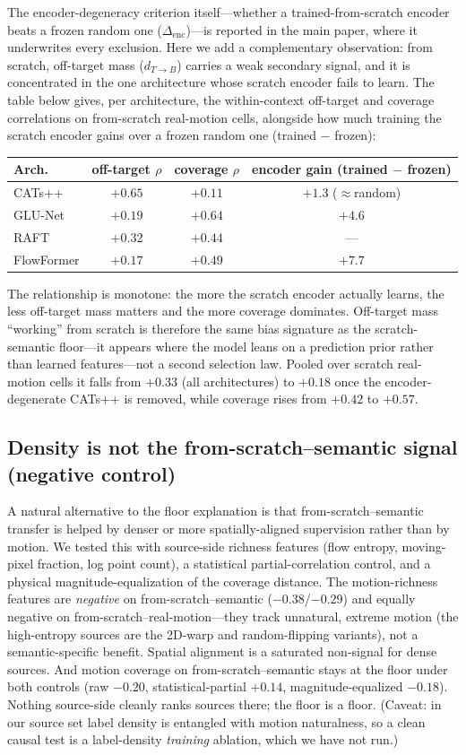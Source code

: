 \documentclass[runningheads]{llncs}
\newcommand{\dtb}{d_{T\to B}}
\begin{document}
The encoder-degeneracy criterion itself---whether a trained-from-scratch encoder
beats a frozen random one ($\Delta_{\text{enc}}$)---is reported in the main paper,
where it underwrites every exclusion. Here we add a complementary observation:
from scratch, off-target mass ($\dtb$) carries a weak secondary signal, and it is
concentrated in the one architecture whose scratch encoder fails to learn. The table below gives, per
architecture, the within-context off-target and coverage correlations on
from-scratch real-motion cells, alongside how much training the scratch encoder
gains over a frozen random one (trained $-$ frozen):
\begin{center}\small
\begin{tabular}{lccc}
\toprule
Arch. & off-target $\rho$ & coverage $\rho$ & encoder gain (trained $-$ frozen) \\
\midrule
CATs++ & $+0.65$ & $+0.11$ & $+1.3$ (\(\approx\)random) \\
GLU-Net & $+0.19$ & $+0.64$ & $+4.6$ \\
RAFT & $+0.32$ & $+0.44$ & --- \\
FlowFormer & $+0.17$ & $+0.49$ & $+7.7$ \\
\bottomrule
\end{tabular}
\end{center}
The relationship is monotone: the more the scratch encoder actually learns, the
less off-target mass matters and the more coverage dominates. Off-target mass
``working'' from scratch is therefore the same bias signature as the
scratch-semantic floor---it appears where the model leans on a prediction prior
rather than learned features---not a second selection law. Pooled over scratch
real-motion cells it falls from $+0.33$ (all architectures) to $+0.18$ once the
encoder-degenerate CATs++ is removed, while coverage rises from $+0.42$ to
$+0.57$.

\subsection{Density is not the from-scratch--semantic signal (negative control)}
A natural alternative to the floor explanation is that from-scratch--semantic
transfer is helped by denser or more spatially-aligned supervision rather than
by motion. We tested this with source-side richness features (flow entropy,
moving-pixel fraction, log point count), a statistical partial-correlation
control, and a physical magnitude-equalization of the coverage distance. The
motion-richness features are \emph{negative} on from-scratch--semantic
($-0.38$/$-0.29$) and equally negative on from-scratch--real-motion---they track
unnatural, extreme motion (the high-entropy sources are the 2D-warp and
random-flipping variants), not a semantic-specific benefit. Spatial alignment is
a saturated non-signal for dense sources. And motion coverage on
from-scratch--semantic stays at the floor under both controls (raw $-0.20$,
statistical-partial $+0.14$, magnitude-equalized $-0.18$). Nothing source-side
cleanly ranks sources there; the floor is a floor. (Caveat: in our source set
label density is entangled with motion naturalness, so a clean causal test is a
label-density \emph{training} ablation, which we have not run.)
\end{document}
